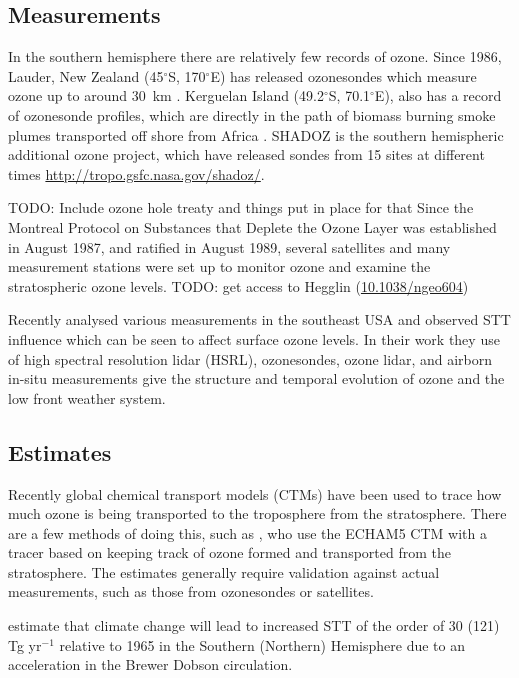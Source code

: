   \subsection{Measurements}
    
    In the southern hemisphere there are relatively few records of ozone.
    Since 1986, Lauder, New Zealand (45$^{\circ}$S, 170$^{\circ}$E) has released ozonesondes which measure ozone up to around 30~km \citep{Brinksma2002}.
    Kerguelan Island (49.2$^{\circ}$S, 70.1$^{\circ}$E), also has a record of ozonesonde profiles, which are directly in the path of biomass burning smoke plumes transported off shore from Africa \citep{Baray2012}.
    SHADOZ is the southern hemispheric additional ozone project, which have released sondes from 15 sites at different times \url{http://tropo.gsfc.nasa.gov/shadoz/}.
    
    TODO: Include ozone hole treaty and things put in place for that
    Since the Montreal Protocol on Substances that Deplete the Ozone Layer was established in August 1987, and ratified in August 1989, several satellites and many measurement stations were set up to monitor ozone and examine the stratospheric ozone levels.
    TODO: get access to Hegglin (\url{10.1038/ngeo604}) \citep{Hegglin2009}
    
    Recently \cite{Kuang2017} analysed various measurements in the southeast USA and observed STT influence which can be seen to affect surface ozone levels.
    In their work they use of high spectral resolution lidar (HSRL), ozonesondes, ozone lidar, and airborn in-situ measurements give the structure and temporal evolution of ozone and the low front weather system.
  \subsection{Estimates}
    
    Recently global chemical transport models (CTMs) have been used to trace how much ozone is being transported to the troposphere from the stratosphere.
    There are a few methods of doing this, such as \citet{Ojha2016}, who use the ECHAM5 CTM with a tracer based on keeping track of ozone formed and transported from the stratosphere.
    The estimates generally require validation against actual measurements, such as those from ozonesondes or satellites.
    
  \citet{Hegglin2009} estimate that climate change will lead to increased STT of the order of 30 (121) Tg yr$^{-1}$ relative to 1965 in the Southern (Northern) Hemisphere due to an acceleration in the Brewer Dobson circulation.
